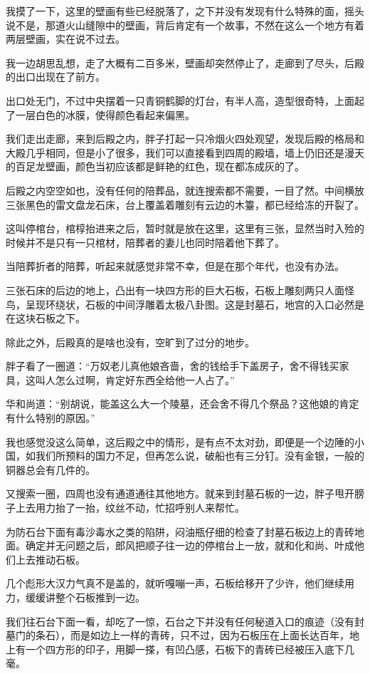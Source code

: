 我摸了一下，这里的壁画有些已经脱落了，之下并没有发现有什么特殊的面，摇头说不是，那道火山缝隙中的壁画，背后肯定有一个故事，不然在这么一个地方有着两层壁画，实在说不过去。

我一边胡思乱想，走了大概有二百多米，壁画却突然停止了，走廊到了尽头，后殿的出口出现在了前方。

出口处无门，不过中央摆着一只青铜鹤脚的灯台，有半人高，造型很奇特，上面起了一层白色的冰膜，使得颜色看起来偏黑。

我们走出走廊，来到后殿之内，胖子打起一只冷烟火四处观望，发现后殿的格局和大殿几乎相同，但是小了很多，我们可以直接看到四周的殿墙，墙上仍旧还是漫天的百足龙壁画，颜色当初应该都是鲜艳的红色，现在都冻成灰的了。

后殿之内空空如也，没有任何的陪葬品，就连搜索都不需要，一目了然。中间横放三张黑色的雷文盘龙石床，台上覆盖着雕刻有云边的木籉，都已经给冻的开裂了。

这叫停棺台，棺椁抬进来之后，暂时就是放在这里，这里有三张，显然当时入殓的时候并不是只有一只棺材，陪葬者的妻儿也同时陪着他下葬了。

当陪葬折者的陪葬，听起来就感觉非常不幸，但是在那个年代，也没有办法。

三张石床的后边的地上，凸出有一块四方形的巨大石板，石板上雕刻两只人面怪鸟，呈现环绕状，石板的中间浮雕着太极八卦图。这是封墓石，地宫的入口必然是在这块石板之下。

除此之外，后殿真的是啥也没有，空旷到了过分的地步。

胖子看了一圈道：“万奴老儿真他娘吝啬，舍的钱给手下盖房子，舍不得钱买家具，这叫人怎么过啊，肯定好东西全给他一人占了。”

华和尚道：“别胡说，能盖这么大一个陵墓，还会舍不得几个祭品？这他娘的肯定有什么特别的原因。”

我也感觉没这么简单，这后殿之中的情形，是有点不太对劲，即便是一个边陲的小国，如我们所预料的国力不足，但再怎么说，破船也有三分钉。没有金银，一般的铜器总会有几件的。

又搜索一圈，四周也没有通道通往其他地方。就来到封墓石板的一边，胖子甩开膀子上去用力抬了一抬，纹丝不动，忙招呼别人来帮忙。

为防石台下面有毒沙毒水之类的陷阱，闷油瓶仔细的检查了封墓石板边上的青砖地面。确定并无问题之后，郎风把顺子往一边的停棺台上一放，就和化和尚、叶成他们上去推动石板。

几个彪形大汉力气真不是盖的，就听嘎嘣一声，石板给移开了少许，他们继续用力，缓缓讲整个石板推到一边。

我们往石台下面一看，却吃了一惊，石台之下并没有任何秘道入口的痕迹（没有封墓门的条石），而是如边上一样的青砖，只不过，因为石板压在上面长达百年，地上有一个四方形的印子，用脚一搽，有凹凸感，石板下的青砖已经被压入底下几毫。

